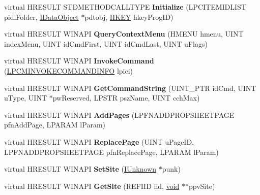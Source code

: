 \begin{DoxyCompactItemize}
\item 
\mbox{\label{class_c_file_def_ext_a7dfb67ae84a24dae5c8ee16309f56d0b}} 
virtual H\+R\+E\+S\+U\+LT S\+T\+D\+M\+E\+T\+H\+O\+D\+C\+A\+L\+L\+T\+Y\+PE {\bfseries Initialize} (L\+P\+C\+I\+T\+E\+M\+I\+D\+L\+I\+ST pidl\+Folder, \hyperlink{interface_i_data_object}{I\+Data\+Object} $\ast$pdtobj, \hyperlink{interfacevoid}{H\+K\+EY} hkey\+Prog\+ID)
\item 
\mbox{\label{class_c_file_def_ext_a5b8b790b8bb8224d1df5d9590a078cfa}} 
virtual H\+R\+E\+S\+U\+LT W\+I\+N\+A\+PI {\bfseries Query\+Context\+Menu} (H\+M\+E\+NU hmenu, U\+I\+NT index\+Menu, U\+I\+NT id\+Cmd\+First, U\+I\+NT id\+Cmd\+Last, U\+I\+NT u\+Flags)
\item 
\mbox{\label{class_c_file_def_ext_a9d3e9731e466b2907dccbc1bda035a4c}} 
virtual H\+R\+E\+S\+U\+LT W\+I\+N\+A\+PI {\bfseries Invoke\+Command} (\hyperlink{struct_i_context_menu_1_1tag_c_m_i_n_v_o_k_e_c_o_m_m_a_n_d_i_n_f_o}{L\+P\+C\+M\+I\+N\+V\+O\+K\+E\+C\+O\+M\+M\+A\+N\+D\+I\+N\+FO} lpici)
\item 
\mbox{\label{class_c_file_def_ext_adab55444fb4ab47bf2b4fc021db38264}} 
virtual H\+R\+E\+S\+U\+LT W\+I\+N\+A\+PI {\bfseries Get\+Command\+String} (U\+I\+N\+T\+\_\+\+P\+TR id\+Cmd, U\+I\+NT u\+Type, U\+I\+NT $\ast$pw\+Reserved, L\+P\+S\+TR psz\+Name, U\+I\+NT cch\+Max)
\item 
\mbox{\label{class_c_file_def_ext_a736877c9f40c6a579ea3e180ad1872d3}} 
virtual H\+R\+E\+S\+U\+LT W\+I\+N\+A\+PI {\bfseries Add\+Pages} (L\+P\+F\+N\+A\+D\+D\+P\+R\+O\+P\+S\+H\+E\+E\+T\+P\+A\+GE pfn\+Add\+Page, L\+P\+A\+R\+AM l\+Param)
\item 
\mbox{\label{class_c_file_def_ext_a66432d374c7e15c201b5e68d2b1e6d1e}} 
virtual H\+R\+E\+S\+U\+LT W\+I\+N\+A\+PI {\bfseries Replace\+Page} (U\+I\+NT u\+Page\+ID, L\+P\+F\+N\+A\+D\+D\+P\+R\+O\+P\+S\+H\+E\+E\+T\+P\+A\+GE pfn\+Replace\+Page, L\+P\+A\+R\+AM l\+Param)
\item 
\mbox{\label{class_c_file_def_ext_a75ffe84fa6d0940af981ab9dd141cd64}} 
virtual H\+R\+E\+S\+U\+LT W\+I\+N\+A\+PI {\bfseries Set\+Site} (\hyperlink{interface_i_unknown}{I\+Unknown} $\ast$punk)
\item 
\mbox{\label{class_c_file_def_ext_a357034eccb4edca85a4e25cc35140f11}} 
virtual H\+R\+E\+S\+U\+LT W\+I\+N\+A\+PI {\bfseries Get\+Site} (R\+E\+F\+I\+ID iid, \hyperlink{interfacevoid}{void} $\ast$$\ast$ppv\+Site)
\end{DoxyCompactItemize}
